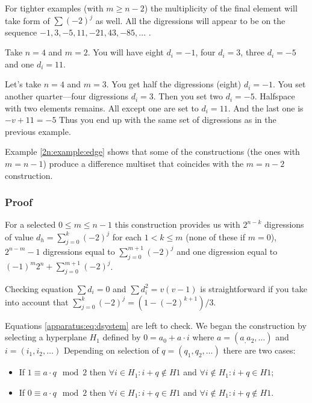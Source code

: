         For tighter examples (with $m\geq n-2$) the multiplicity of the final element will take form of $\sum (-2)^j$ as well. All the digressions will appear to be on the sequence $-1,3,-5,11,-21,43,-85,\ldots$ \cite{A077925}.
        
        \begin{example}
          Take $n=4$ and $m=2$. You will have eight $d_i=-1$, four $d_i=3$, three $d_i=-5$ and one $d_i=11$.
        \end{example}
        
        \begin{example}
            \label{2n:example:edge}
            Let's take $n=4$ and $m=3$. You get half the digressions (eight) $d_i=-1$. You set another quarter---four digressions $d_i=3$. Then you set two $d_i=-5$. Halfspace with two elements remains. All except one are set to $d_i=11$. And the last one is $-v+11=-5$ Thus you end up with the same set of digressions as in the previous example.
        \end{example}

        Example \ref{2n:example:edge} shows that some of the constructions (the ones with $m=n-1$) produce a difference multiset that coincides with the $m=n-2$ construction.
    
    \subsubsection{Proof}
        For a selected $0 \leq m \leq n-1$ this construction provides us with $2^{n-k}$ digressions of value $d_h=\sum\limits_{j=0}^k(-2)^j$ for each $1<k\leq m$ (none of these if $m=0$), $2^{n-m}-1$ digressions equal to $\sum\limits_{j=0}^{m+1}(-2)^j$ and one digression equal to $(-1)^m 2^n+\sum\limits_{j=0}^{m+1}(-2)^j$.
        
        Checking equation $\sum d_i = 0$ and $\sum d_i^2 = v(v-1)$ is straightforward if you take into account that $\sum\limits_{j=0}^k(-2)^j=(1-(-2)^{k+1})/3$.
        
        Equations \eqref{apparatus:eq:dsystem} are left to check. We began the construction by selecting a hyperplane $H_1$ defined by $0=a_0+a\cdot i$ where $a=(a_,a_2,\ldots)$ and $i=(i_1,i_2,\ldots)$ Depending on selection of $q=(q_1,q_2,\ldots)$ there are two cases:
        \begin{itemize}
            \item If $1 \equiv a\cdot q \mod 2$ then $\forall i \in H_1 : i+q \notin H1 $ and $\forall i \notin H_1 : i+q \in H1$;
            \item If $0 \equiv a\cdot q \mod 2$ then $\forall i \in H_1 : i+q \in H1 $ and $\forall i \notin H_1 : i+q \notin H1$.
        \end{itemize}
        
